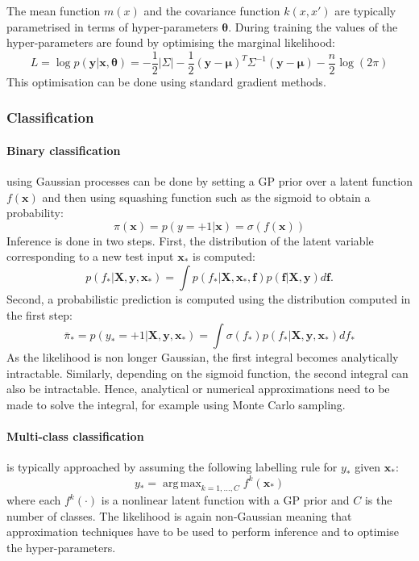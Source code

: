 \documentclass{article}
\DeclareMathOperator*{\argmax}{arg\,max} %
\begin{document}
The mean function $m(x)$ and the covariance function $k(x,x')$ are typically parametrised in terms of hyper-parameters $\bm{\theta}$. During training the values of the hyper-parameters are found by optimising the marginal likelihood:
\begin{equation*}
	L = \log p(\bm{y}\vert\bm{x},\bm{\theta}) = -\frac{1}{2}\vert\Sigma\vert - \frac{1}{2}(\bm{y}-\bm{\mu})^T\Sigma^{-1}(\bm{y}-\bm{\mu}) - \frac{n}{2}\log(2\pi)
\end{equation*}
This optimisation can be done using standard gradient methods.
\subsubsection{Classification}
\paragraph{Binary classification} using Gaussian processes can be done by setting a GP prior over a latent function $f(\mathbf{x})$ and then using squashing function such as the sigmoid to obtain a probability:
\begin{equation*}
	\pi(\mathbf{x}) = p(y = +1 \vert \mathbf{x}) = \sigma(f(\mathbf{x}))
\end{equation*}
Inference is done in two steps. First, the distribution of the latent variable corresponding to a new test input $\mathbf{x}_*$ is computed:
\begin{equation*}
	p(f_*  \vert \mathbf{X}, \mathbf{y}, \mathbf{x}_*) = \int p (f_*  \vert \mathbf{X}, \mathbf{x}_*, \mathbf{f}) p(\mathbf{f} \vert \mathbf{X}, \mathbf{y}) d\mathbf{f}.
\end{equation*}
Second, a probabilistic prediction is computed using the distribution computed in the first step:
\begin{equation*}
	\bar{\pi}_* = p(y_* = +1 |\mathbf{X}, \mathbf{y}, \mathbf{x}_*) = \int \sigma(f_*) p(f_*  \vert \mathbf{X}, \mathbf{y}, \mathbf{x}_*) df_*
\end{equation*}
As the likelihood is non longer Gaussian, the first integral becomes analytically intractable. Similarly, depending on the sigmoid function, the second integral can also be intractable. Hence, analytical or numerical approximations need to be made to solve the integral, for example using Monte Carlo sampling.

\paragraph{Multi-class classification} is typically \cite{villacampa2017scalable} approached by assuming the following labelling rule for $y_*$ given $\mathbf{x}_*$:
\begin{equation*}
	y_* = \argmax_{k=1,\dots,C} f^k(\mathbf{x}_*)
\end{equation*} 
where each $f^k(\cdot)$ is a nonlinear latent function with a GP prior and $C$ is the number of classes. The likelihood is again non-Gaussian meaning that approximation techniques have to be used to perform inference and to optimise the hyper-parameters.
\end{document}
